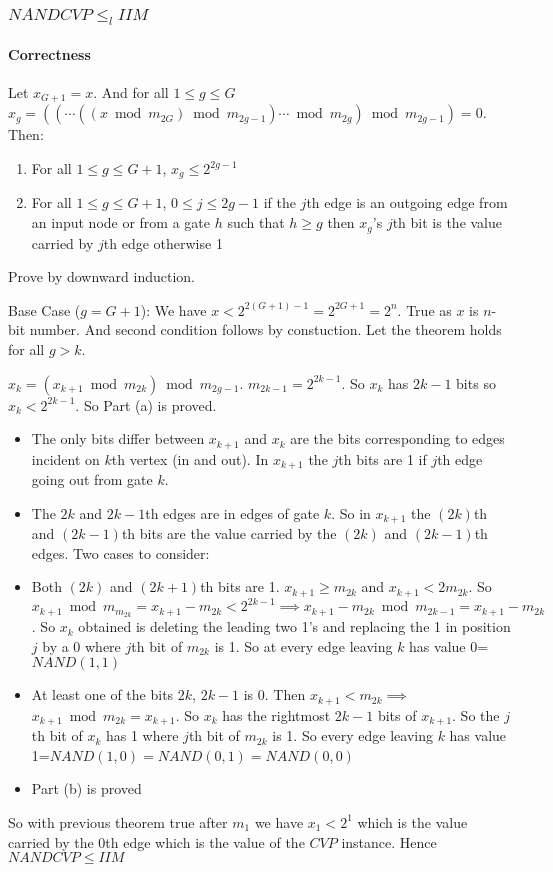 \documentclass[article,8pt]{beamer}%
\begin{document}
\begin{frame}[allowframebreaks]
\frametitle{$NANDCVP\leq_l IIM$}
\framesubtitle{Correctness}
\begin{theorem}
	Let $x_{G+1}=x$. And for all $1\leq g\leq G$ $x_g=((\cdots ((x\bmod{m_{2G}})\bmod{m_{2g-1}})\cdots\bmod{m_{2g}})\bmod{m_{2g-1}})=0$. Then:\begin{enumerate}
		\item For all $1\leq g\leq G+1$, $x_g\leq 2^{2g-1}$
		\item For all $1\leq g\leq G+1$, $0\leq j\leq 2g-1$ if the $j$th edge is an outgoing edge from an input node or from a gate $h$ such that $h\geq g$ then $x_g$'s $j$th bit is the value carried by $j$th edge 		otherwise 1
	\end{enumerate}
\end{theorem}
Prove by downward induction.

\hspace{0.5cm} Base Case ($g=G+1$): We have $x< 2^{2(G+1)-1}=2^{2G+1}=2^{n}$. True as $x$ is $n$-bit number. And second condition follows by constuction.
Let the theorem holds for all $g>k$. 

\hspace{0.5cm} $x_k=(x_{k+1}\bmod{m_{2k}})\bmod{m_{2g-1}}$. $m_{2k-1}=2^{2k-1}$. So $x_k$ has $2k-1$ bits so $ x_k<2^{2k-1}$. So Part (a) is proved.
\framebreak

\begin{itemize}
	\item The only bits differ between $x_{k+1}$ and $x_k$ are the bits corresponding to edges incident on $k$th vertex (in and out). In $x_{k+1}$ the $j$th bits are 1 if $j$th edge going out from gate $k$.
	\item The $2k$ and $2k-1$th edges are in edges of gate $k$. So in $x_{k+1}$ the $(2k)$th and $(2k-1)$th bits are the value carried by the $(2k)$ and $(2k-1)$th edges. Two cases to consider:
	\item Both $(2k)$ and $(2k+1)$th bits are 1. $x_{k+1}\geq m_{2k}$ and $x_{k+1}< 2m_{2k}$. So $x_{k+1}\bmod{m_{m_{2k}}}=x_{k+1}-m_{2k}<2^{2k-1}\implies x_{k+1}-m_{2k}\bmod m_{2k-1}=x_{k+1}-m_{2k}$. So $x_k$ obtained is deleting the leading two 1's and replacing the 1 in position $j$ by a 0 where $j$th bit of $m_{2k}$ is 1. So at every edge leaving $k$ has value 0=$NAND(1,1)$
	\item At least one of the bits $2k$, $2k-1$ is 0. Then $x_{k+1}<m_{2k}\implies$ $x_{k+1}\bmod{m_{2k}}=x_{k+1}$. So $x_{k}$ has the rightmost $2k-1$ bits of $x_{k+1}$. So the $j$th bit of $x_k$ has 1 where $j$th bit of $m_{2k}$ is 1. So every edge leaving $k$ has value 1=$NAND(1,0)=NAND(0,1)=NAND(0,0)$
	\item Part (b) is proved
\end{itemize}
So with previous theorem true after $m_1$ we have $x_1< 2^{1}$ which is the value carried by the $0$th edge which is the value of the $CVP$ instance. Hence $NANDCVP\leq IIM$
\end{frame}
\end{document}
